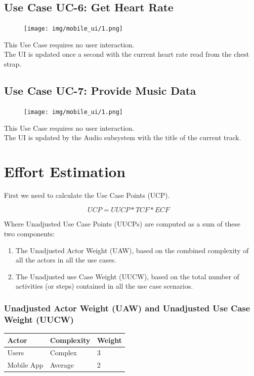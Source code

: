 \documentclass[letterpaper,english, 12pt]{scrreprt}
\begin{document}
\subsection{Use Case UC-6: Get Heart Rate}
\begin{figure}[H]
	\centering
	\texttt{[image: img/mobile\_ui/1.png]}\\
\end{figure}

This Use Case requires no user interaction.\\
The UI is updated once a second with the current heart rate read from the chest strap.

\subsection{Use Case UC-7: Provide Music Data}
\begin{figure}[H]
	\centering
	\texttt{[image: img/mobile\_ui/1.png]}\\
\end{figure}

This Use Case requires no user interaction.\\
The UI is updated by the Audio subsystem with the title of the current track.

\section{Effort Estimation}

First we need to calculate the Use Case Points (UCP).

\begin{equation}
UCP = UUCP* TCF *ECF
\end{equation}

Where Unadjusted Use Case Points (UUCPs) are computed as a sum of these two components:

\begin{enumerate}
\item The Unadjusted Actor Weight (UAW), based on the combined complexity of all the actors in all the use cases.
\item The Unadjusted use Case Weight (UUCW), based on the total number of activities (or steps) contained in all the use case scenarios.
\end{enumerate}


\subsubsection{Unadjusted Actor Weight (UAW) and Unadjusted Use Case Weight (UUCW)}
\begin{center}
        \begin{tabular}{|C{3cm}|C{3cm}|C{3cm}|}
                \hline
                        Actor & Complexity & Weight \\
                \hline
                       Users & Complex & 3 \\
                \hline
                       Mobile App & Average & 2 \\
                \hline
        \end{tabular}
\end{center}
\end{document}
